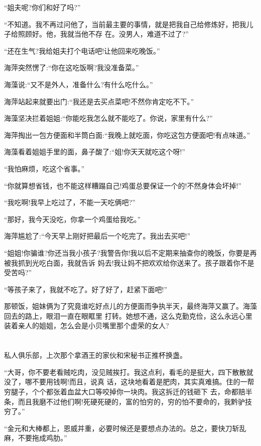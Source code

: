 \documentclass[11pt,a4paper,onecolumn]{article}
\begin{document}
``姐夫呢?你们和好了吗?''

``不知道。我不再过问他了，当前最主要的事情，就是把我自己给修炼好，把我儿子给照顾好。他，我就当他不存
在。没男人，难道不过了?''

``还在生气?我给姐夫打个电话吧!让他回来吃晚饭。''

海萍突然愣了:``你在这吃饭啊?我没准备菜。''

海藻说:``又不是外人，准备什么?有什么吃什么。''

海萍站起来就要出门:``我还是去买点菜吧!不然你肯定吃不下。''

海藻坚决拦着姐姐:``你能吃我怎么就不能吃了。你说，家里有什么?''

海萍掏出一包方便面和半筒白面:``我晚上就吃面，你吃这包方便面吧!有点味道。''

海藻看着姐姐手里的面，鼻子酸了:``姐!你天天就吃这个呀!''

``我怕麻烦，吃这个省事。''

``你就算想省钱，也不能这样糟蹋自己!鸡蛋总要保证一个的!不然身体会坏掉!''

``我吃啊!我早上吃过了，不能一天吃俩吧?''

``那好，我今天没吃，你拿一个鸡蛋给我吃。''

海萍尴尬了:``今天早上刚好把最后一个吃完了。我出去买吧!''

``姐姐!你骗谁?你还当我小孩子?我警告你!我以后不定期来抽查你的晚饭，你要是再被我抓到光吃白面，我就告诉
妈去!我让妈不把欢欢给你送来了。孩子跟着你不是受苦吗?''

``等孩子来了，我就不吃了。好了好了，赶紧下面吧!''

那顿饭，姐妹俩为了究竟谁吃好点儿的方便面而争执半天，最终海萍又赢了。海藻回去的路上，眼泪一直在眼眶里
打转。她想不通，这么克勤克俭，这么永远心里装着亲人的姐姐，怎么会是小贝嘴里那个虚荣的女人?

\section[\thesection]{}

私人俱乐部，上次那个拿酒王的家伙和宋秘书正推杯换盏。

``大哥，你不要老看贼吃肉，没见贼挨打。我这点利，看毛的是挺大，四下散散就没了，哪不要用钱啊!而且，说真
话，这块地看着是肥肉，其实真难搞。住的一帮穷腿子，个个都张着血盆大口等咬掉你一块肉。我这拆迁的钱砸下
去，命都赔半条，而且我磨不过他们啊!死硬死硬的，富的怕穷的，穷的怕不要命的，我黔驴技穷了。''

``金元和大棒都上，恩威并重，必要时候还是要想点办法的。总之，要快刀斩乱麻，不要拖成鸡肋。''
\end{document}
